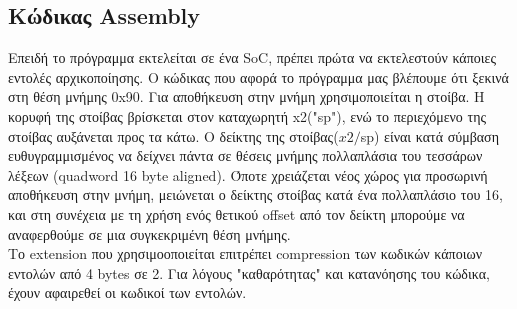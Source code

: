 \documentclass[a4paper]{article}
\begin{document}
\subsection*{Κώδικας Assembly}
\par Επειδή το πρόγραμμα εκτελείται σε ένα SoC, πρέπει πρώτα να εκτελεστούν κάποιες 
εντολές αρχικοποίησης. Ο κώδικας που αφορά το πρόγραμμα μας βλέπουμε ότι ξεκινά στη θέση μνήμης 0x90. 
Για αποθήκευση στην μνήμη χρησιμοποιείται η στοίβα. Η κορυφή της στοίβας βρίσκεται στον καταχωρητή x2("sp"), ενώ το 
περιεχόμενο της στοίβας αυξάνεται προς τα κάτω. Ο δείκτης της στοίβας($x2/$sp) είναι κατά σύμβαση ευθυγραμμισμένος να δείχνει πάντα 
σε θέσεις μνήμης πολλαπλάσια του τεσσάρων λέξεων (quadword 16 byte aligned). Όποτε χρειάζεται νέος χώρος για προσωρινή αποθήκευση στην μνήμη, 
μειώνεται ο δείκτης στοίβας κατά ένα πολλαπλάσιο του 16, και στη συνέχεια με τη χρήση ενός θετικού offset από τον δείκτη μπορούμε να αναφερθούμε σε μια συγκεκριμένη θέση μνήμης. \\
Το extension που χρησιμοοποιείται επιτρέπει compression των κωδικών κάποιων εντολών από 4 bytes σε 2. Για λόγους "καθαρότητας" και κατανόησης του κώδικα, έχουν αφαιρεθεί οι κωδικοί 
των εντολών.
\end{document}
